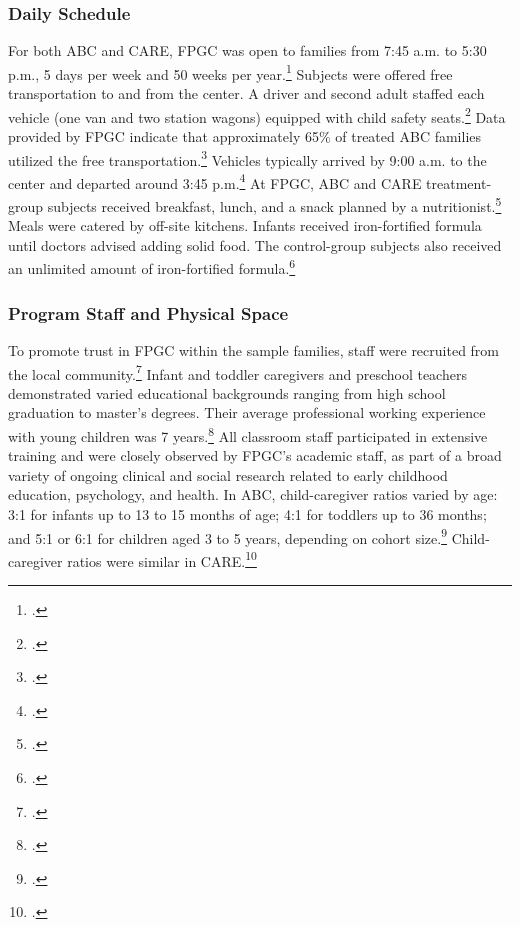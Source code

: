 \begin{appendices}
\subsubsection{Daily Schedule}
\noindent For both ABC and CARE, FPGC was open to families from 7:45 a.m. to 5:30 p.m., 5 days per week and 50 weeks per year.\footnote{\citet{Ramey_Collier_etal_1976_CarolinaAbecedarianProject, Ramey_etal_1985_Project-CARE_TiECSE}.} Subjects were offered free transportation to and from the center. A driver and second adult staffed each vehicle (one van and two station wagons) equipped with child safety seats.\footnote{\citet{Ramey_Campbell_1979_SR,abc2014-2015interviews}.} Data provided by FPGC indicate that approximately 65\% of treated ABC families utilized the free transportation.\footnote{\citet{Barnett_Masse_2002_benefitcost}.} Vehicles typically arrived by 9:00 a.m. to the center and departed around 3:45 p.m.\footnote{\citet{Ramey-et-al_1977_Intro-to-ABC}.} At FPGC, ABC and CARE treatment-group subjects received breakfast, lunch, and a snack planned by a nutritionist.\footnote{ \citet{Haskins_1985_CD, Bryant_et_al_1987_Carolina_Approach_TIECSE, Ramey-et-al_1977_Intro-to-ABC}.} Meals were catered by off-site kitchens. Infants received iron-fortified formula  until doctors advised adding solid food. The control-group subjects also received an unlimited amount of iron-fortified formula.\footnote{\citet{Campbell_Conti_etal_2014_EarlyChildhoodInvestments,abc2014-2015interviews}.}  \\

\subsubsection{Program Staff and Physical Space}
\noindent To promote trust in FPGC within the sample families, staff were recruited from the local community.\footnote{\citet{Ramey-et-al_1977_Intro-to-ABC, Bryant_et_al_1987_Carolina_Approach_TIECSE, Feagans_1996_Childrens-Talk,abc2014-2015interviews}.} Infant and toddler caregivers and preschool teachers demonstrated varied educational backgrounds ranging from high school graduation to master's degrees. Their average professional working experience with young children was 7 years.\footnote{\citet{Ramey_McGinness_etal_1982_Abecedarianapproach, Ramey_etal_1985_Project-CARE_TiECSE, Wasik_Ramey_etal_1990_CD}.} All classroom staff participated in extensive training and were closely observed by FPGC's academic staff, as part of a broad variety of ongoing clinical and social research related to early childhood education, psychology, and health. In ABC, child-caregiver ratios varied by age: 3:1 for infants up to 13 to 15 months of age; 4:1 for toddlers up to 36 months; and 5:1 or 6:1 for children aged 3 to 5 years, depending on cohort size.\footnote{\citet{Ramey-et-al_1977_Intro-to-ABC,Ramey_Campbell_1979_SR,Ramey_McGinness_etal_1982_Abecedarianapproach}.} Child-caregiver ratios were similar in CARE.\footnote{\citet{Burchinal_Campbell_etal_1997_CD, Ramey_etal_1985_Project-CARE_TiECSE}.}\\


\end{appendices}
